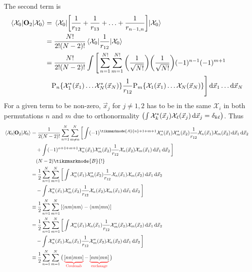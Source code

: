 \documentclass[12pt,a4paper,titlepage]{article}
\newcommand{\trm}[1]{\textrm{#1}} %
\newcommand{\Chi}{\mathcal{X}} %
\newcommand{\perm}{\trm{P}} %
\begin{document}
The second term is
\begin{equation}
\begin{aligned}
\mel{\Chi_{0}}{\vb{O}_{2}}{\Chi_{0}}&=\mel{\Chi_{0}}{\qty[\frac{1}{r_{12}}+\frac{1}{r_{13}}+\ldots+\frac{1}{r_{n-1,n}}]}{\Chi_{0}}\\
&=\frac{N!}{2!(N-2)!}\mel{\Chi_{0}}{\frac{1}{r_{12}}}{\Chi_{0}}\\
&=\frac{N!}{2!(N-2)!}\int\Bigg[\sum_{n=1}^{N!}\sum_{m=1}^{N!}\qty(\frac{1}{\sqrt{N!}})\qty(\frac{1}{\sqrt{N!}})(-1)^{n-1}(-1)^{m+1}\\
&\quad\perm_{n}\{\Chi_{1}^{*}(\vec{x}_{1})\ldots\Chi_{N}^{*}(\vec{x}_{N})\}\frac{1}{r_{12}}\perm_{m}\{\Chi_{1}(\vec{x}_{1})\ldots\Chi_{N}(\vec{x}_{N})\}\Bigg]\dd{\vec{x}_{1}}\ldots\dd{\vec{x}_{N}}
\end{aligned}
\end{equation}
For a given term to be non-zero, $\vec{x}_{j}$ for $j\neq1,2$ has to be in the same $\Chi_{i}$ in both permutations $n$ and $m$ due to orthonormality $\qty(\int\Chi_{k}^{*}(\vec{x}_{j})\Chi_{\ell}(\vec{x}_{j})\dd{\vec{x}_{j}}=\delta_{k\ell})$. Thus
\begin{equation}
\begin{aligned}
\mel{\Chi_{0}}{\vb{O}_{2}}{\Chi_{0}}&=\frac{1}{2(N-2)!}\sum_{n=1}^{N}\sum_{m\neq n}^{N}\bigg[\int(-1)^{\tikzmarknode{A}{n}+1+m+1}\Chi_{n}^{*}(\vec{x}_{1})\Chi_{m}^{*}(\vec{x}_{2})\frac{1}{r_{12}}\Chi_{n}(\vec{x}_{1})\Chi_{m}(\vec{x}_{2})\dd{\vec{x}_{1}}\dd{\vec{x}_{2}}\\
&\quad+\int(-1)^{n+1+m+1}\Chi_{n}^{*}(\vec{x}_{1})\Chi_{m}^{*}(\vec{x}_{2})\frac{1}{r_{12}}\Chi_{n}(\vec{x}_{2})\Chi_{m}(\vec{x}_{1})\dd{\vec{x}_{1}}\dd{\vec{x}_{2}}\bigg]\\
&\quad(N-2)\tikzmarknode{B}{!}\\
&=\frac{1}{2}\sum_{n=1}^{N}\sum_{m=1}^{N}\bigg[\int\Chi_{n}^{*}(\vec{x}_{1})\Chi_{m}^{*}(\vec{x}_{2})\frac{1}{r_{12}}\Chi_{n}(\vec{x}_{1})\Chi_{m}(\vec{x}_{2})\dd{\vec{x}_{1}}\dd{\vec{x}_{2}}\\
&\quad-\int\Chi_{n}^{*}(\vec{x}_{1})\Chi_{m}^{*}(\vec{x}_{2})\frac{1}{r_{12}}\Chi_{n}(\vec{x}_{2})\Chi_{m}(\vec{x}_{1})\dd{\vec{x}_{1}}\dd{\vec{x}_{2}}\bigg]\\
&\equiv\frac{1}{2}\sum_{n=1}^{N}\sum_{m=1}^{N}\qty[\ip{nm}{nm}-\ip{nm}{mn}]\\
&=\frac{1}{2}\sum_{n=1}^{N}\sum_{m=1}^{N}\bigg[\int\Chi_{n}^{*}(\vec{x}_{1})\Chi_{n}(\vec{x}_{1})\frac{1}{r_{12}}\Chi_{m}^{*}(\vec{x}_{2})\Chi_{m}(\vec{x}_{2})\dd{\vec{x}_{1}}\dd{\vec{x}_{2}}\\
&\quad-\int\Chi_{n}^{*}(\vec{x}_{1})\Chi_{m}(\vec{x}_{1})\frac{1}{r_{12}}\Chi_{m}^{*}(\vec{x}_{2})\Chi_{n}(\vec{x}_{2})\dd{\vec{x}_{1}}\dd{\vec{x}_{2}}\bigg]\\
&\equiv\frac{1}{2}\sum_{n=1}^{N}\sum_{m=1}^{N}\big(\color{red}\underbrace{\color{black}[nn|mm]}_{\trm{Coulomb}}{\color{black}-}\underbrace{\color{black}[nm|mn]}_{\trm{exchange}}\color{black}\big)
\end{aligned}
\end{equation}
\end{document}
